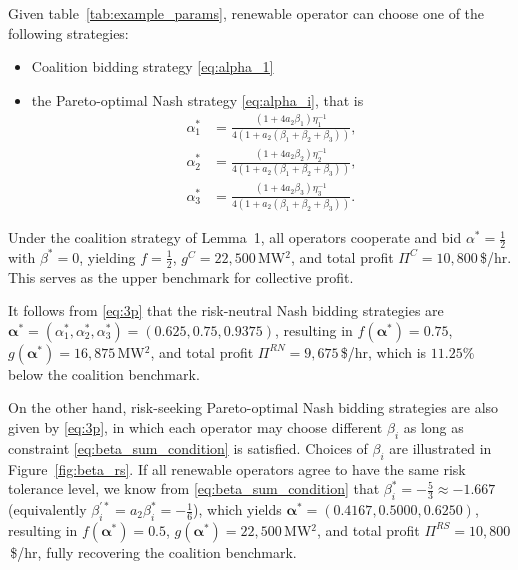 \documentclass[conference]{IEEEtran}
\begin{document}
Given table~\ref{tab:example_params}, renewable operator can choose one of the following strategies:
\begin{itemize}
    \item Coalition bidding strategy \eqref{eq:alpha_1} 
    \item the Pareto-optimal Nash strategy \eqref{eq:alpha_i}, that is
\begin{subequations}
\begin{align}
\alpha_1^*
&=
\frac{(1+4a_2\beta_1)\eta_1^{-1}}
{4\left(1+a_2(\beta_1+\beta_2+\beta_3)\right)},
\\[6pt]
\alpha_2^*
&=
\frac{(1+4a_2\beta_2)\eta_2^{-1}}
{4\left(1+a_2(\beta_1+\beta_2+\beta_3)\right)},
\\[6pt]
\alpha_3^*
&=
\frac{(1+4a_2\beta_3)\eta_3^{-1}}
{4\left(1+a_2(\beta_1+\beta_2+\beta_3)\right)}.
\end{align}
\label{eq:3p}
\end{subequations}
\end{itemize}

Under the coalition strategy of Lemma~1, all operators cooperate and bid $\alpha^*=\frac{1}{2}$ with $\beta^*=0$, yielding $f=\frac{1}{2}$, $g^C = 22{,}500$\,MW$^2$, and total profit $\Pi^C = 10{,}800$\,\$/hr. This serves as the upper benchmark for collective profit.

It follows from \eqref{eq:3p} that the risk-neutral Nash bidding strategies are $\boldsymbol{\alpha}^* =(\alpha_1^*, \alpha_2^*, \alpha_3^*) = (0.625, 0.75, 0.9375)$, resulting in $f(\boldsymbol{\alpha}^*)=0.75$, $g(\boldsymbol{\alpha}^*)=16{,}875$\,MW$^2$, and total profit $\Pi^{RN} = 9{,}675$\,\$/hr, which is $11.25\%$ below the coalition benchmark.

On the other hand, risk-seeking Pareto-optimal Nash bidding strategies are also given by \eqref{eq:3p}, in which each operator may choose different $\beta_i$ as long as constraint \eqref{eq:beta_sum_condition} is satisfied. Choices of $\beta_i$ are illustrated in Figure~\ref{fig:beta_rs}. If all renewable operators agree to have the same risk tolerance level, we know from \eqref{eq:beta_sum_condition} that $\beta_i^* = -\frac{5}{3} \approx -1.667$ (equivalently $\beta_i^{\prime *} = a_2\beta_i^* = -\frac{1}{6}$), which yields $\boldsymbol{\alpha}^*=(0.4167, 0.5000, 0.6250)$, resulting in $f(\boldsymbol{\alpha}^*)=0.5$, $g(\boldsymbol{\alpha}^*)=22{,}500$\,MW$^2$, and total profit $\Pi^{RS} = 10{,}800$\,\$/hr, fully recovering the coalition benchmark.
 
\end{document}

